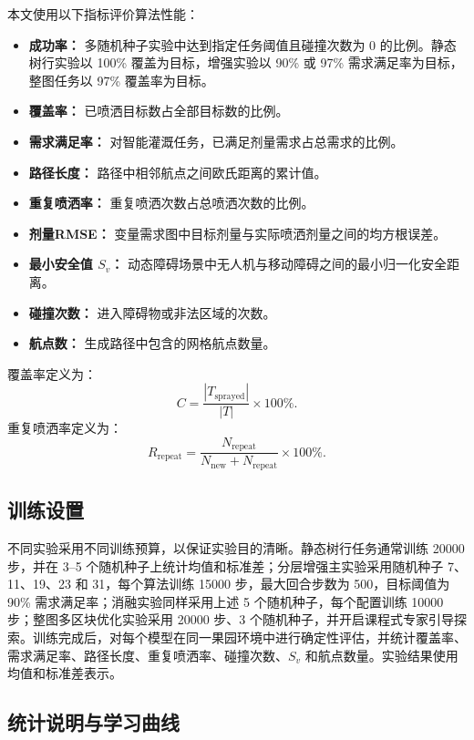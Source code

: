 \documentclass[UTF8]{ctexart}
\begin{document}
本文使用以下指标评价算法性能：
\begin{itemize}
  \item \textbf{成功率：} 多随机种子实验中达到指定任务阈值且碰撞次数为 0 的比例。静态树行实验以 100\% 覆盖为目标，增强实验以 90\% 或 97\% 需求满足率为目标，整图任务以 97\% 覆盖率为目标。
  \item \textbf{覆盖率：} 已喷洒目标数占全部目标数的比例。
  \item \textbf{需求满足率：} 对智能灌溉任务，已满足剂量需求占总需求的比例。
  \item \textbf{路径长度：} 路径中相邻航点之间欧氏距离的累计值。
  \item \textbf{重复喷洒率：} 重复喷洒次数占总喷洒次数的比例。
  \item \textbf{剂量RMSE：} 变量需求图中目标剂量与实际喷洒剂量之间的均方根误差。
  \item \textbf{最小安全值 $S_v$：} 动态障碍场景中无人机与移动障碍之间的最小归一化安全距离。
  \item \textbf{碰撞次数：} 进入障碍物或非法区域的次数。
  \item \textbf{航点数：} 生成路径中包含的网格航点数量。
\end{itemize}

覆盖率定义为：
\begin{equation}
C = \frac{|T_{\mathrm{sprayed}}|}{|T|} \times 100\%.
\end{equation}
重复喷洒率定义为：
\begin{equation}
R_{\mathrm{repeat}} = \frac{N_{\mathrm{repeat}}}{N_{\mathrm{new}} + N_{\mathrm{repeat}}} \times 100\%.
\end{equation}

\subsection{训练设置}

不同实验采用不同训练预算，以保证实验目的清晰。静态树行任务通常训练 20000 步，并在 3--5 个随机种子上统计均值和标准差；分层增强主实验采用随机种子 7、11、19、23 和 31，每个算法训练 15000 步，最大回合步数为 500，目标阈值为 90\% 需求满足率；消融实验同样采用上述 5 个随机种子，每个配置训练 10000 步；整图多区块优化实验采用 20000 步、3 个随机种子，并开启课程式专家引导探索。训练完成后，对每个模型在同一果园环境中进行确定性评估，并统计覆盖率、需求满足率、路径长度、重复喷洒率、碰撞次数、$S_v$ 和航点数量。实验结果使用均值和标准差表示。

\subsection{统计说明与学习曲线}
\end{document}
